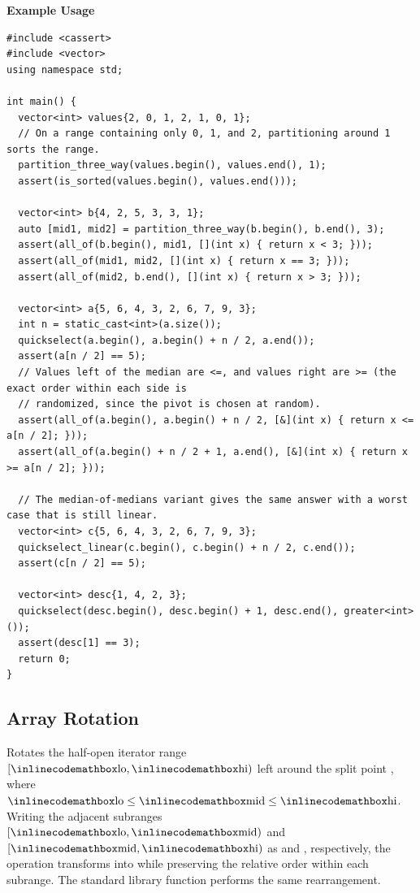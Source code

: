 \textbf{Example Usage}\par
\begin{lstlisting}[style=cpp]
#include <cassert>
#include <vector>
using namespace std;

int main() {
  vector<int> values{2, 0, 1, 2, 1, 0, 1};
  // On a range containing only 0, 1, and 2, partitioning around 1 sorts the range.
  partition_three_way(values.begin(), values.end(), 1);
  assert(is_sorted(values.begin(), values.end()));

  vector<int> b{4, 2, 5, 3, 3, 1};
  auto [mid1, mid2] = partition_three_way(b.begin(), b.end(), 3);
  assert(all_of(b.begin(), mid1, [](int x) { return x < 3; }));
  assert(all_of(mid1, mid2, [](int x) { return x == 3; }));
  assert(all_of(mid2, b.end(), [](int x) { return x > 3; }));

  vector<int> a{5, 6, 4, 3, 2, 6, 7, 9, 3};
  int n = static_cast<int>(a.size());
  quickselect(a.begin(), a.begin() + n / 2, a.end());
  assert(a[n / 2] == 5);
  // Values left of the median are <=, and values right are >= (the exact order within each side is
  // randomized, since the pivot is chosen at random).
  assert(all_of(a.begin(), a.begin() + n / 2, [&](int x) { return x <= a[n / 2]; }));
  assert(all_of(a.begin() + n / 2 + 1, a.end(), [&](int x) { return x >= a[n / 2]; }));

  // The median-of-medians variant gives the same answer with a worst case that is still linear.
  vector<int> c{5, 6, 4, 3, 2, 6, 7, 9, 3};
  quickselect_linear(c.begin(), c.begin() + n / 2, c.end());
  assert(c[n / 2] == 5);

  vector<int> desc{1, 4, 2, 3};
  quickselect(desc.begin(), desc.begin() + 1, desc.end(), greater<int>());
  assert(desc[1] == 3);
  return 0;
}
\end{lstlisting}
\subsection{Array Rotation}
\label{sec:1.1.3}
Rotates the half-open iterator range $[{\inlinecodemath{lo}}, {\inlinecodemath{hi}})$ left around the split point , where ${\inlinecodemath{lo}} \leq {\inlinecodemath{mid}} \leq {\inlinecodemath{hi}}$. Writing the adjacent subranges $[{\inlinecodemath{lo}}, {\inlinecodemath{mid}})$ and $[{\inlinecodemath{mid}}, {\inlinecodemath{hi}})$ as  and , respectively, the operation transforms  into  while preserving the relative order within each subrange. The standard library function  performs the same rearrangement.

